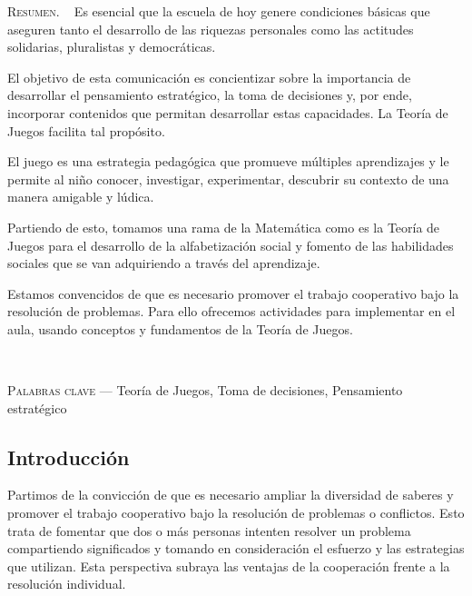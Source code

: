 \begin{center}
	\begin{minipage}{0.75\linewidth} \small
		\textsc{Resumen}. ~
		Es esencial que la escuela de hoy genere condiciones básicas que aseguren tanto el desarrollo de las riquezas personales como las actitudes solidarias, pluralistas y democráticas.
		
		El objetivo de esta comunicación es concientizar sobre la importancia de desarrollar el pensamiento estratégico, la toma de decisiones y, por ende, incorporar contenidos que permitan desarrollar estas capacidades. La Teoría de Juegos facilita tal propósito.
		
		El juego es una estrategia pedagógica que promueve múltiples aprendizajes y le permite al niño conocer, investigar, experimentar, descubrir su contexto de una manera amigable y lúdica.
		
		Partiendo de esto, tomamos una rama de la Matemática como es la Teoría de Juegos para el desarrollo de la alfabetización social y fomento de las habilidades sociales que se van adquiriendo a través del aprendizaje.
		
		Estamos convencidos de que es necesario promover el trabajo cooperativo bajo la resolución de problemas. Para ello ofrecemos actividades para implementar en el aula, usando conceptos y fundamentos de la Teoría de Juegos.
	\end{minipage}\\
	
	\vspace{0.5em}
	
	\begin{minipage}{0.75\linewidth} \small
		\textsc{Palabras clave} --- Teoría de Juegos, Toma de decisiones, Pensamiento estratégico
	\end{minipage}
\end{center}

\subsection{Introducción}

Partimos de la convicción de que es necesario ampliar la diversidad de saberes y promover el trabajo cooperativo bajo la resolución de problemas o conflictos. Esto trata de fomentar que dos o más personas intenten resolver un problema compartiendo significados y tomando en consideración el esfuerzo y las estrategias que utilizan. Esta perspectiva subraya las ventajas de la cooperación frente a la resolución individual.


